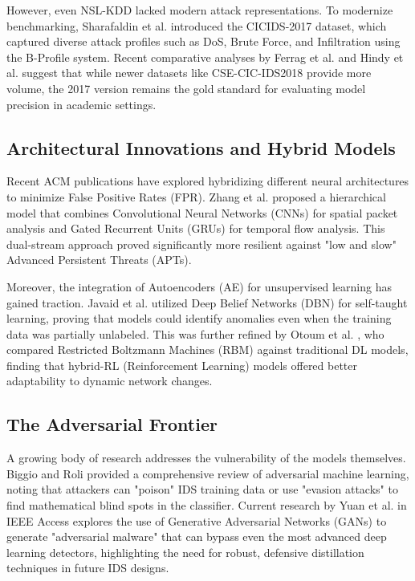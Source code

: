\documentclass[10pt, conference, compsocconf, letterpaper, twocolumn, twoside]{IEEEtran}
\begin{document}
However, even NSL-KDD lacked modern attack representations. To modernize benchmarking, Sharafaldin et al. \cite{sharafaldin2018} introduced the CICIDS-2017 dataset, which captured diverse attack profiles such as DoS, Brute Force, and Infiltration using the B-Profile system. Recent comparative analyses by Ferrag et al. \cite{ferrag2020} and Hindy et al. \cite{hindy2020} suggest that while newer datasets like CSE-CIC-IDS2018 provide more volume, the 2017 version remains the gold standard for evaluating model precision in academic settings.

\subsection{Architectural Innovations and Hybrid Models}
Recent ACM publications have explored hybridizing different neural architectures to minimize False Positive Rates (FPR). Zhang et al. \cite{zhang2019} proposed a hierarchical model that combines Convolutional Neural Networks (CNNs) for spatial packet analysis and Gated Recurrent Units (GRUs) for temporal flow analysis. This dual-stream approach proved significantly more resilient against "low and slow" Advanced Persistent Threats (APTs).

Moreover, the integration of Autoencoders (AE) for unsupervised learning has gained traction. Javaid et al. \cite{javaid2016} utilized Deep Belief Networks (DBN) for self-taught learning, proving that models could identify anomalies even when the training data was partially unlabeled. This was further refined by Otoum et al. \cite{otoum2019}, who compared Restricted Boltzmann Machines (RBM) against traditional DL models, finding that hybrid-RL (Reinforcement Learning) models offered better adaptability to dynamic network changes.

\subsection{The Adversarial Frontier}
A growing body of research addresses the vulnerability of the models themselves. Biggio and Roli \cite{biggio2018} provided a comprehensive review of adversarial machine learning, noting that attackers can "poison" IDS training data or use "evasion attacks" to find mathematical blind spots in the classifier. Current research by Yuan et al. \cite{yuan2019} in IEEE Access explores the use of Generative Adversarial Networks (GANs) to generate "adversarial malware" that can bypass even the most advanced deep learning detectors, highlighting the need for robust, defensive distillation techniques in future IDS designs.
\end{document}
